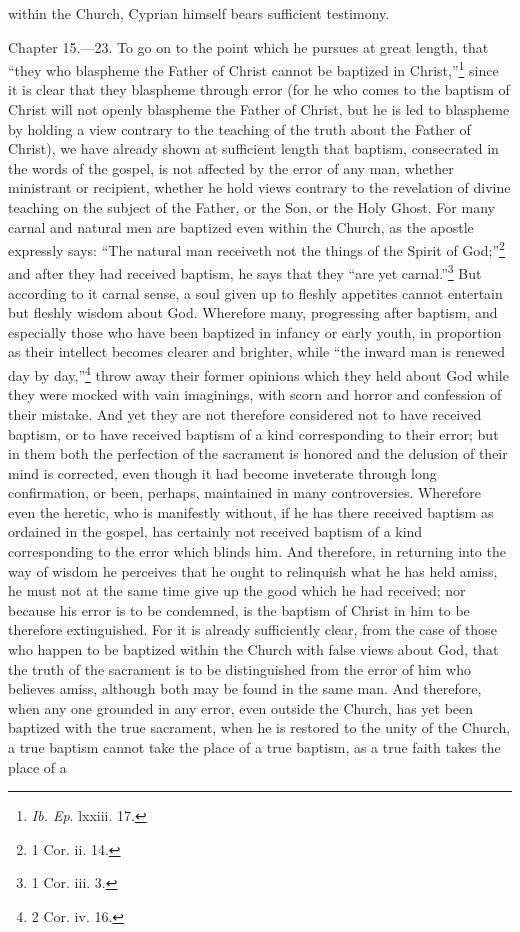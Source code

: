within the Church, Cyprian himself bears sufficient testimony.


Chapter 15.—23. To go on to the point which he pursues at great length, that ``they who blaspheme the Father of Christ cannot be baptized in Christ,''\footnote{\par  \emph{Ib. Ep}. lxxiii. 17.} since it is clear that they blaspheme through error (for he who comes to the baptism of Christ will not openly blaspheme the Father of Christ, but he is led to blaspheme by holding a view contrary to the teaching of the truth about the Father of Christ), we have already shown at sufficient length that baptism, consecrated in the words of the gospel, is not affected by the error of any man, whether ministrant or recipient, whether he hold views contrary to the revelation of divine teaching on the subject of the Father, or the Son, or the Holy Ghost. For many carnal and natural men are baptized even within the Church, as the apostle expressly says: ``The natural man receiveth not the things of the Spirit of God;''\footnote{\par  1 Cor. ii. 14.} and after they had received baptism, he says that they ``are yet carnal.''\footnote{\par  1 Cor. iii. 3.} But according to it carnal sense, a soul given up to fleshly appetites cannot entertain but fleshly wisdom about God. Wherefore many, progressing after baptism, and especially those who have been baptized in infancy or early youth, in proportion as their intellect becomes clearer and brighter, while ``the inward man is renewed day by day,''\footnote{\par  2 Cor. iv. 16.} throw away their former opinions which they held about God while they were mocked with vain imaginings, with scorn and horror and confession of their mistake. And yet they are not therefore considered not to have received baptism, or to have received baptism of a kind corresponding to their error; but in them both the perfection of the sacrament is honored and the delusion of their mind is corrected, even though it had become inveterate through long confirmation, or been, perhaps, maintained in many controversies. Wherefore even the heretic, who is manifestly without, if he has there received baptism as ordained in the gospel, has certainly not received baptism of a kind corresponding to the error which blinds him. And therefore, in returning into the way of wisdom he perceives that he ought to relinquish what he has held amiss, he must not at the same time give up the good which he had received; nor because his error is to be condemned, is the baptism of Christ in him to be therefore extinguished. For it is already sufficiently clear, from the case of those who happen to be baptized within the Church with false views about God, that the truth of the sacrament is to be distinguished from the error of him who believes amiss, although both may be found in the same man. And therefore, when any one grounded in any error, even outside the Church, has yet been baptized with the true sacrament, when he is restored to the unity of the Church, a true baptism cannot take the place of a true baptism, as a true faith takes the place of a 